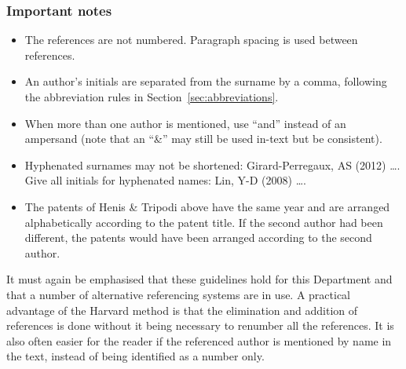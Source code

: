 \documentclass[a5paper, 10pt]{article}
\begin{document}
\subsubsection*{Important notes}

\begin{itemize}
\item The references are not numbered.  Paragraph spacing is used
  between references.
\item An author's initials are separated from the surname by a comma,
  following the abbreviation rules in Section~\ref{sec:abbreviations}.
\item When more than one author is mentioned, use ``and'' instead of an 
  ampersand (note that an ``\&'' may still be used in-text but be consistent).
\item Hyphenated surnames may not be shortened: Girard-Perregaux, AS (2012) \dots. 
  Give all initials for hyphenated names: Lin, Y-D (2008) \dots.
\item The patents of Henis \& Tripodi above have the same year and are arranged
  alphabetically according to the patent title.  If the second author had been
  different, the patents would have been arranged according to the
  second author.
\end{itemize}

It must again be emphasised that these guidelines hold for this
Department and that a number of alternative referencing systems are in
use.  A practical advantage of the Harvard method is that the
elimination and addition of references is done without it being
necessary to renumber all the references.  It is also often easier for
the reader if the referenced author is mentioned by name in the text,
instead of being identified as a number only.
\end{document}
